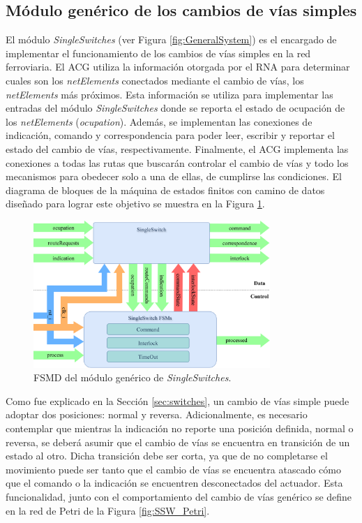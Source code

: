 \subsection{Módulo genérico de los cambios de vías simples}
	\label{sec:ACG_ssw}
	
	El módulo \textit{SingleSwitches} (ver Figura \ref{fig:GeneralSystem}) es el encargado de implementar el funcionamiento de los cambios de vías simples en la red ferroviaria. El ACG utiliza la información otorgada por el RNA para determinar cuales son los \textit{netElements} conectados mediante el cambio de vías, los \textit{netElements} más próximos. Esta información se utiliza para implementar las entradas del módulo \textit{SingleSwitches} donde se reporta el estado de ocupación de los \textit{netElements} (\textit{ocupation}). Además, se implementan las conexiones de indicación, comando y correspondencia para poder leer, escribir y reportar el estado del cambio de vías, respectivamente. Finalmente, el ACG implementa las conexiones a todas las rutas que buscarán controlar el cambio de vías y todo los mecanismos para obedecer solo a una de ellas, de cumplirse las condiciones. El diagrama de bloques de la máquina de estados finitos con camino de datos diseñado para lograr este objetivo se muestra en la Figura \ref{fig:SSW_module}.
	
	\begin{figure}[H]
		\centering
		\includegraphics[width=0.8\textwidth]{Figuras/SSW_module}
		\centering\caption{FSMD del módulo genérico de \textit{SingleSwitches}.}
		\label{fig:SSW_module}
	\end{figure}
	
	Como fue explicado en la Sección \ref{sec:switches}, un cambio de vías simple puede adoptar dos posiciones: normal y reversa. Adicionalmente, es necesario contemplar que mientras la indicación no reporte una posición definida, normal o reversa, se deberá asumir que el cambio de vías se encuentra en transición de un estado al otro. Dicha transición debe ser corta, ya que de no completarse el movimiento puede ser tanto que el cambio de vías se encuentra atascado cómo que el comando o la indicación se encuentren desconectados del actuador. Esta funcionalidad, junto con el comportamiento del cambio de vías genérico se define en la red de Petri de la Figura \ref{fig:SSW_Petri}.
	
